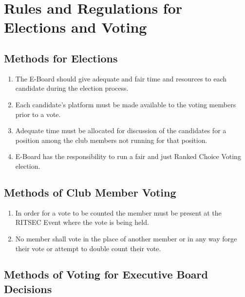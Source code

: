 
\section{Rules and Regulations for Elections and Voting}

\subsection{Methods for Elections}

\begin{enumerate}
  \item The E-Board should give adequate and fair time and resources to each
    candidate during the election process.
  \item Each candidate's platform must be made available to the voting members
    prior to a vote.
  \item Adequate time must be allocated for discussion of the candidates for a
    position among the club members not running for that position.
  \item E-Board has the responsibility to run a fair and just Ranked Choice
    Voting election.
\end{enumerate}

\subsection{Methods of Club Member Voting}

\begin{enumerate}
  \item In order for a vote to be counted the member must be present at the
    RITSEC Event where the vote is being held.
  \item No member shall vote in the place of another member or in any way forge
    their vote or attempt to double count their vote.
\end{enumerate}

\subsection{Methods of Voting for Executive Board Decisions}

